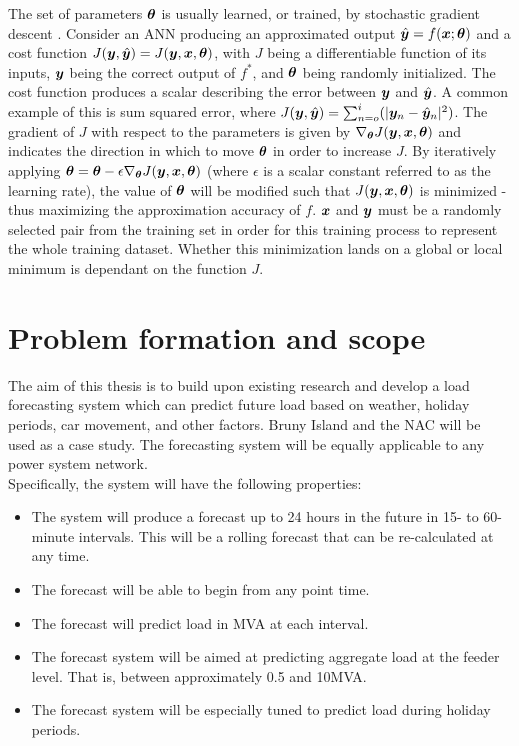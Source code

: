 \par
The set of parameters ${\bm{\theta}}$ is usually learned, or trained, by stochastic gradient descent \citep{Bottou2011}.
Consider an ANN producing an approximated output $\hat{{\bm{y}}} = f({\bm{x}}; {\bm{\theta}})$ and a cost function $J({\bm{y}}, \hat{{\bm{y}}}) = J({\bm{y}}, {\bm{x}}, {\bm{\theta}})$, with  $J$ being a differentiable function of its inputs, ${\bm{y}}$ being the correct output of $f^*$, and ${\bm{\theta}}$ being randomly initialized.
The cost function produces a scalar describing the error between ${\bm{y}}$ and $\hat{{\bm{y}}}$.
A common example of this is sum squared error, where $J({\bm{y}}, \hat{{\bm{y}}}) = \sum_{n=o}^{i}(|{\bm{y}}_n - \hat{{\bm{y}}}_n|^2)$.
The gradient of $J$ with respect to the parameters is given by $\nabla_{{\bm{\theta}}}J({\bm{y}}, {\bm{x}}, {\bm{\theta}})$ and indicates the direction in which to move ${\bm{\theta}}$ in order to increase $J$.
By iteratively applying ${\bm{\theta}} = {\bm{\theta}} - \epsilon \nabla_{{\bm{\theta}}}J({\bm{y}}, {\bm{x}}, {\bm{\theta}})$ (where $\epsilon$ is a scalar constant referred to as the learning rate), the value of ${\bm{\theta}}$ will be modified such that $J({\bm{y}}, {\bm{x}}, {\bm{\theta}})$ is minimized - thus maximizing the approximation accuracy of $f$.
${\bm{x}}$ and ${\bm{y}}$ must be a randomly selected pair from the training set in order for this training process to represent the whole training dataset.
Whether this minimization lands on a global or local minimum is dependant on the function $J$.
\par


\section{Problem formation and scope}
The aim of this thesis is to build upon existing research and develop a load forecasting system which can predict future load based on weather, holiday periods, car movement, and other factors. 
Bruny Island and the NAC will be used as a case study. 
The forecasting system will be equally applicable to any power system network.
\\
Specifically, the system will have the following properties:
\begin{itemize}
	\item The system will produce a forecast up to 24 hours in the future in 15- to 60-minute intervals. This will be a rolling forecast that can be re-calculated at any time.
	\item The forecast will be able to begin from any point time.
	\item The forecast will predict load in MVA at each interval.
	\item The forecast system will be aimed at predicting aggregate load at the feeder level. That is, between approximately 0.5 and 10MVA.
	\item The forecast system will be especially tuned to predict load during holiday periods.
\end{itemize}
